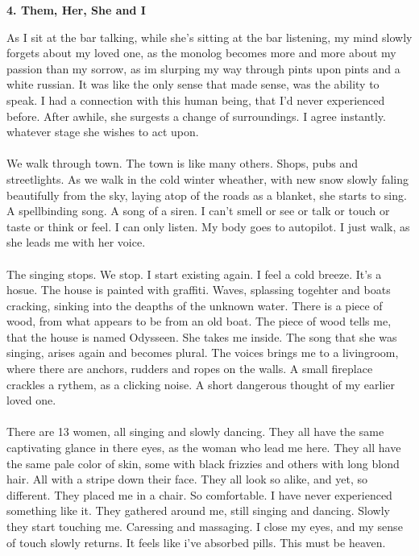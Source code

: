 \documentclass[]{article}
\begin{document}
\newpage

\begin{center}
	\large\textbf{4. Them, Her, She and I}
\end{center}

As I sit at the bar talking, while she's sitting at the bar listening, my mind slowly forgets about my loved one, as the monolog becomes more and more about my passion than my sorrow, as im slurping my way through pints upon pints and a white russian. It was like the only sense that made sense, was the ability to speak. I had a connection with this human being, that I'd never experienced before. After awhile, she surgests a change of surroundings. I agree instantly. whatever stage she wishes to act upon. 
\\ \\
We walk through town. The town is like many others. Shops, pubs and streetlights. As we walk in the cold winter wheather, with new snow slowly faling beautifully from the sky, laying atop of the roads as a blanket, she starts to sing. A spellbinding song. A song of a siren. I can't smell or see or talk or touch or taste or think or feel. I can only listen. My body goes to autopilot. I just walk, as she leads me with her voice. 
\\ \\
The singing stops. We stop. I start existing again. I feel a cold breeze. It's a hosue. The house is painted with graffiti. Waves, splassing togehter and boats cracking, sinking into the deapths of the unknown water. There is a piece of wood, from what appears to be from an old boat. The piece of wood tells me, that the house is named Odysseen. She takes me inside. The song that she was singing, arises again and becomes plural. The voices brings me to a livingroom, where there are anchors, rudders and ropes on the walls. A small fireplace crackles a rythem, as a clicking noise. A short dangerous thought of my earlier loved one.
\\ \\
There are 13 women, all singing and slowly dancing. They all have the same captivating glance in there eyes, as the woman who lead me here. They all have the same pale color of skin, some with black frizzies and others with long blond hair. All with a stripe down their face. They all look so alike, and yet, so different. They placed me in a chair. So comfortable. I have never experienced something like it. They gathered around me, still singing and dancing. Slowly they start touching me. Caressing and massaging. I close my eyes, and my sense of touch slowly returns. It feels like i've absorbed pills. This must be heaven.
\end{document}
